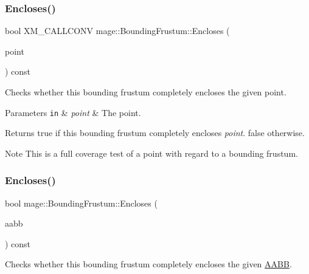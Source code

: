 \subsubsection{\texorpdfstring{Encloses()}{Encloses()}\hspace{0.1cm}{\footnotesize\ttfamily [2/4]}}
{\footnotesize\ttfamily bool X\+M\+\_\+\+C\+A\+L\+L\+C\+O\+NV mage\+::\+Bounding\+Frustum\+::\+Encloses (\begin{DoxyParamCaption}\item[{F\+X\+M\+V\+E\+C\+T\+OR}]{point }\end{DoxyParamCaption}) const\hspace{0.3cm}{\ttfamily [noexcept]}}

Checks whether this bounding frustum completely encloses the given point.


\begin{DoxyParams}[1]{Parameters}
\mbox{\tt in}  & {\em point} & The point. \\
\hline
\end{DoxyParams}
\begin{DoxyReturn}{Returns}
{\ttfamily true} if this bounding frustum completely encloses {\itshape point}. {\ttfamily false} otherwise. 
\end{DoxyReturn}
\begin{DoxyNote}{Note}
This is a full coverage test of a point with regard to a bounding frustum. 
\end{DoxyNote}
\mbox{\label{classmage_1_1_bounding_frustum_a09642eff00ef33d0b5ea4890c9adc4b2}} 
\subsubsection{\texorpdfstring{Encloses()}{Encloses()}\hspace{0.1cm}{\footnotesize\ttfamily [3/4]}}
{\footnotesize\ttfamily bool mage\+::\+Bounding\+Frustum\+::\+Encloses (\begin{DoxyParamCaption}\item[{const \mbox{\hyperlink{classmage_1_1_a_a_b_b}{A\+A\+BB}} \&}]{aabb }\end{DoxyParamCaption}) const\hspace{0.3cm}{\ttfamily [noexcept]}}

Checks whether this bounding frustum completely encloses the given \mbox{\hyperlink{classmage_1_1_a_a_b_b}{A\+A\+BB}}.


